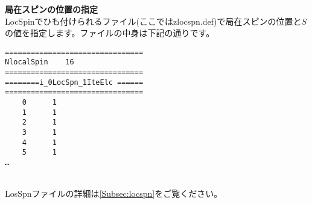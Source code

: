\begin{description}
\item {\bf 局在スピンの位置の指定}\\
LocSpinでひも付けられるファイル(ここではzlocspn.def)で局在スピンの位置と$S$の値を指定します。ファイルの中身は下記の通りです。\\
\begin{minipage}{15cm}
\begin{screen}
\begin{verbatim}
================================ 
NlocalSpin    16  
================================ 
========i_0LocSpn_1IteElc ====== 
================================ 
    0      1
    1      1
    2      1
    3      1
    4      1
    5      1
…
\end{verbatim}
\end{screen}
\end{minipage}
~\\
LosSpnファイルの詳細は\ref{Subsec:locspn}をご覧ください。
\end{description}

